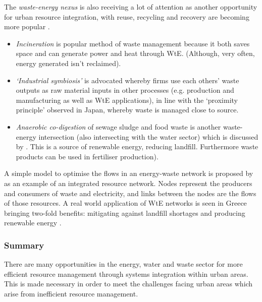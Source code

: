 The \emph{waste-energy nexus} is also receiving a lot of attention as another opportunity for urban resource integration, with reuse, recycling and recovery are becoming more popular \citep{Geng2010}. 
\begin{itemize} 
	\item \emph{Incineration} is popular method of waste management because it both saves space and can generate power and heat through WtE. (Although, very often, energy generated isn't reclaimed).  
	\item \emph{`Industrial symbiosis'} is advocated whereby firms use each others' waste outputs as raw material inputs in other processes (e.g. production and manufacturing as well as WtE applications), in line with the `proximity principle' observed in Japan, whereby waste is managed close to source. %
	\item \emph{Anaerobic co-digestion} of sewage sludge and food waste is another waste-energy intersection (also intersecting with the water sector) which is discussed by \citet{Iacovidou2012}. This is a source of renewable energy, reducing landfill. Furthermore waste products can be used in fertiliser production).
\end{itemize}
A simple model to optimise the flows in an energy-waste network is proposed by \citet{Kharrazi2012} as an example of an integrated resource network. Nodes represent the producers and consumers of waste and electricity, and links between the nodes are the flows of those resources. A real world application of WtE networks is seen in Greece bringing two-fold benefits: mitigating against landfill shortages and producing renewable energy \citep{Xydis2012}.

\subsubsection*{Summary}
There are many opportunities in the energy, water and waste sector for more efficient resource management through systems integration within urban areas. This is made necessary in order to meet the challenges facing urban areas which arise from inefficient resource management.
%
%
